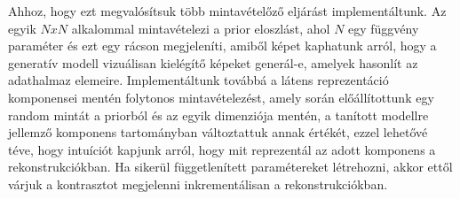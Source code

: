 \documentclass[12pt, english]{article}
\begin{document}
\vspace{4mm}

\par Ahhoz, hogy ezt megvalósítsuk több mintavételőző eljárást implementáltunk. Az egyik $N x N$ alkalommal mintavételezi a prior eloszlást, ahol $N$ egy függvény paraméter és ezt egy rácson megjeleníti, amiből képet kaphatunk arról, hogy a generatív modell vizuálisan kielégítő képeket generál-e, amelyek hasonlít az adathalmaz elemeire. Implementáltunk továbbá a látens reprezentáció komponensei mentén folytonos mintavételezést, amely során előállítottunk egy random mintát a priorból és az egyik dimenziója mentén, a tanított modellre jellemző komponens tartományban változtattuk annak értékét, ezzel lehetővé téve, hogy intuíciót kapjunk arról, hogy mit reprezentál az adott komponens a rekonstrukciókban. Ha sikerül függetlenített paramétereket létrehozni, akkor ettől várjuk a kontrasztot megjelenni inkrementálisan a rekonstrukciókban.

\vspace{4mm}
\end{document}
